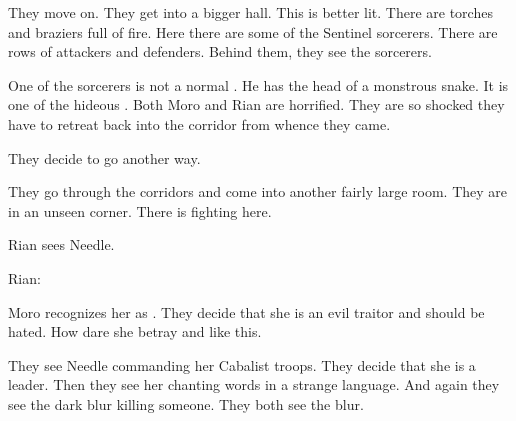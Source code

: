 They move on. 
They get into a bigger hall.
This is better lit. 
There are torches and braziers full of fire. 
Here there are some of the Sentinel sorcerers.
There are rows of attackers and defenders.
Behind them, they see the sorcerers. 

One of the sorcerers is not a normal \scatha.
He has the head of a monstrous snake.
It is one of the hideous \serpentmen. 
Both Moro and Rian are horrified.
They are so shocked they have to retreat back into the corridor from whence they came. 

% 

They decide to go another way. 

\begin{comment}
  \subsection{Meeting Needle}
\end{comment}
They go through the corridors and come into another fairly large room.
They are in an unseen corner. 
There is fighting here.

Rian sees Needle.

Rian:

Moro recognizes her as \Piacet. 
They decide that she is an evil traitor and should be hated.
How dare she betray \Malcur and \rinyuth[\Tiroco] like this. 

They see Needle commanding her Cabalist troops. 
They decide that she is a leader. 
Then they see her chanting words in a strange language. 
And again they see the dark blur killing someone. 
They both see the blur. 

